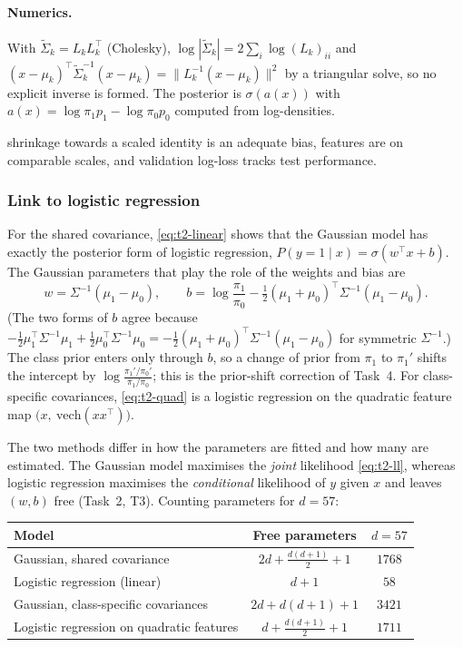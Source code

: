 \paragraph{Numerics.}
With $\tilde\Sigma_k=L_kL_k^{\top}$ (Cholesky), $\log|\tilde\Sigma_k|=2\sum_i\log(L_k)_{ii}$ and
$(x-\mu_k)^{\top}\tilde\Sigma_k^{-1}(x-\mu_k)=\|L_k^{-1}(x-\mu_k)\|^2$ by a triangular solve, so no explicit
inverse is formed. The posterior is $\sigma(a(x))$ with $a(x)=\log\pi_1p_1-\log\pi_0p_0$ computed from
log-densities.

\begin{assumptions}
shrinkage towards a scaled identity is an adequate bias, features are on comparable
scales, and validation log-loss tracks test performance.
\end{assumptions}

\subsubsection{Link to logistic regression}\label{sec:t2-lr}
For the shared covariance, \eqref{eq:t2-linear} shows that the Gaussian model has exactly the posterior
form of logistic regression, $P(y=1\mid x)=\sigma(w^{\top}x+b)$. The Gaussian parameters that play the role
of the weights and bias are
\[
  w=\Sigma^{-1}(\mu_1-\mu_0),\qquad
  b=\log\frac{\pi_1}{\pi_0}-\tfrac12(\mu_1+\mu_0)^{\top}\Sigma^{-1}(\mu_1-\mu_0).
\]
(The two forms of $b$ agree because $-\frac12\mu_1^{\top}\Sigma^{-1}\mu_1+\frac12\mu_0^{\top}\Sigma^{-1}\mu_0
=-\frac12(\mu_1+\mu_0)^{\top}\Sigma^{-1}(\mu_1-\mu_0)$ for symmetric $\Sigma^{-1}$.) The class prior enters only through
$b$, so a change of prior from $\pi_1$ to $\pi_1'$ shifts the intercept by
$\log\frac{\pi_1'/\pi_0'}{\pi_1/\pi_0}$; this is the prior-shift correction of Task~4.
For class-specific covariances, \eqref{eq:t2-quad} is a logistic regression on the quadratic feature map
$\bigl(x,\ \mathrm{vech}(xx^{\top})\bigr)$.

The two methods differ in how the parameters are fitted and how many are estimated. The Gaussian model
maximises the \emph{joint} likelihood \eqref{eq:t2-ll}, whereas logistic regression maximises the
\emph{conditional} likelihood of $y$ given $x$ and leaves $(w,b)$ free (Task~2, T3). Counting parameters for $d=57$:

\begin{center}
\begin{tabular}{lcc}
\toprule
Model & Free parameters & $d=57$\\
\midrule
Gaussian, shared covariance & $2d+\tfrac{d(d+1)}2+1$ & $1768$\\
Logistic regression (linear) & $d+1$ & $58$\\
Gaussian, class-specific covariances & $2d+d(d+1)+1$ & $3421$\\
Logistic regression on quadratic features & $d+\tfrac{d(d+1)}2+1$ & $1711$\\
\bottomrule
\end{tabular}
\end{center}

